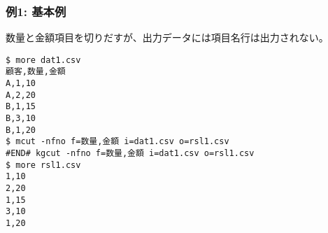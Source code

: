 \subsubsection*{例1: 基本例}

数量と金額項目を切りだすが、出力データには項目名行は出力されない。


\begin{Verbatim}[baselinestretch=0.7,frame=single]
$ more dat1.csv
顧客,数量,金額
A,1,10
A,2,20
B,1,15
B,3,10
B,1,20
$ mcut -nfno f=数量,金額 i=dat1.csv o=rsl1.csv
#END# kgcut -nfno f=数量,金額 i=dat1.csv o=rsl1.csv
$ more rsl1.csv
1,10
2,20
1,15
3,10
1,20
\end{Verbatim}
